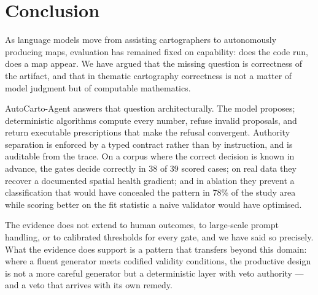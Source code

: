 \section{Conclusion}
As language models move from assisting cartographers to autonomously producing maps, evaluation has remained fixed on capability: does the code run, does a map appear. We have argued that the missing question is correctness of the artifact, and that in thematic cartography correctness is not a matter of model judgment but of computable mathematics.

AutoCarto-Agent answers that question architecturally. The model proposes; deterministic algorithms compute every number, refuse invalid proposals, and return executable prescriptions that make the refusal convergent. Authority separation is enforced by a typed contract rather than by instruction, and is auditable from the trace. On a corpus where the correct decision is known in advance, the gates decide correctly in 38 of 39 scored cases; on real data they recover a documented spatial health gradient; and in ablation they prevent a classification that would have concealed the pattern in 78\% of the study area while scoring better on the fit statistic a naive validator would have optimised.

The evidence does not extend to human outcomes, to large-scale prompt handling, or to calibrated thresholds for every gate, and we have said so precisely. What the evidence does support is a pattern that transfers beyond this domain: where a fluent generator meets codified validity conditions, the productive design is not a more careful generator but a deterministic layer with veto authority --- and a veto that arrives with its own remedy.
